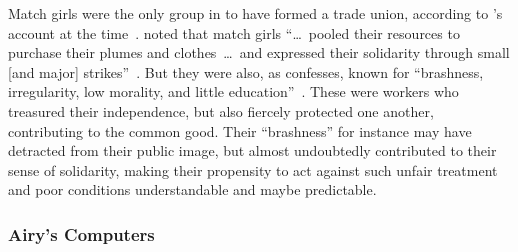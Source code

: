 \documentclass[trackingWork]{subfiles}
\begin{document}
Match girls were the only group in \citeyear{booth1903life} to have formed a trade union,
according to \citeauthor{booth1903life}'s account at the time~\cite{booth1903life}.
\citeauthor{10.2307/3827491} noted that match girls
``\dots~pooled their resources to purchase their plumes and clothes~\dots~and expressed their solidarity through small [and major] strikes''~\cite{booth1903life}.
But they were also, as \citeauthor{10.2307/3827491} confesses, known for ``brashness, irregularity, low morality, and little education''~\cite{10.2307/3827491}.
These were workers who treasured their independence, but also fiercely protected one another, contributing to the common good.
Their ``brashness'' for instance may have detracted from their public image, but almost undoubtedly contributed to their sense of solidarity,
making their propensity to act against such unfair treatment and poor conditions understandable and maybe predictable.






\subsubsection{Airy's Computers}

\begin{comment}
What did I pull from the threads that are related to industrial and railroad workers (i.e. 1920 onward?)

- Airy and his human computers were great:
  - quickly verifiable
  - independent tasks (could be checked without the whole product)
  - narrowly trainable

\end{comment}
\end{document}

